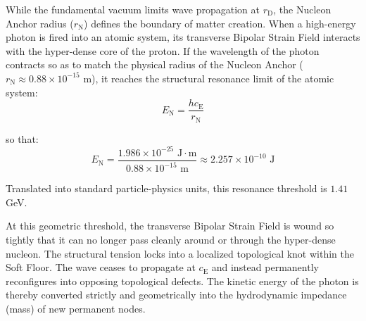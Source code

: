 While the fundamental vacuum limits wave propagation at $r_{\mathrm{D}}$, the Nucleon Anchor radius ($r_{\mathrm{N}}$) defines the boundary of matter creation. When a high-energy photon is fired into an atomic system, its transverse Bipolar Strain Field interacts with the hyper-dense core of the proton. If the wavelength of the photon contracts so as to match the physical radius of the Nucleon Anchor ($r_{\mathrm{N}} \approx 0.88 \times 10^{-15}$ m), it reaches the structural resonance limit of the atomic system:
\begin{equation}
    E_{\mathrm{N}} = \frac{h c_{\mathrm{E}}}{r_{\mathrm{N}}}
\end{equation}

so that:
\begin{equation}
    E_{\mathrm{N}} = \frac{1.986 \times 10^{-25} \text{ J}\cdot\text{m}}{0.88 \times 10^{-15} \text{ m}} \approx 2.257 \times 10^{-10} \text{ J}
\end{equation}

Translated into standard particle-physics units, this resonance threshold is $1.41$ GeV.

At this geometric threshold, the transverse Bipolar Strain Field is wound so tightly that it can no longer pass cleanly around or through the hyper-dense nucleon. The structural tension locks into a localized topological knot within the Soft Floor. The wave ceases to propagate at $c_{\mathrm{E}}$ and instead permanently reconfigures into opposing topological defects. The kinetic energy of the photon is thereby converted strictly and geometrically into the hydrodynamic impedance (mass) of new permanent nodes.
